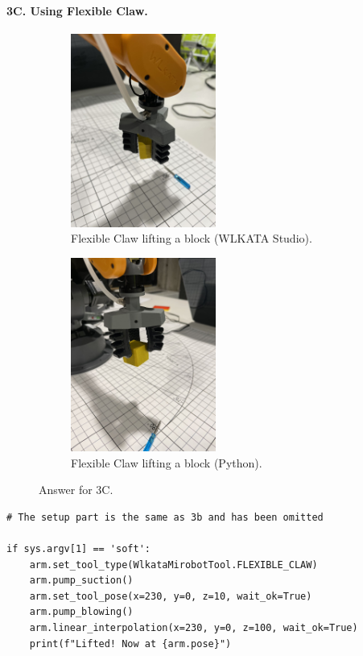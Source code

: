\newpage
\paragraph{3C. Using Flexible Claw.}
\begin{figure}
    \centering
    \begin{subfigure}[b]{0.3\textwidth}
        \includegraphics[height=2.5in]{image/3c_studio.jpg}
         \caption*{Flexible Claw lifting a block (WLKATA Studio).}
     \end{subfigure}
     \hfill
     \begin{subfigure}[b]{0.3\textwidth}
        \includegraphics[height=2.5in]{image/3c_python.jpg}
         \caption*{Flexible Claw lifting a block (Python).}
     \end{subfigure}
    \caption*{Answer for 3C.}
\end{figure}
%
\begin{verbatim}
# The setup part is the same as 3b and has been omitted

if sys.argv[1] == 'soft':
    arm.set_tool_type(WlkataMirobotTool.FLEXIBLE_CLAW)
    arm.pump_suction()
    arm.set_tool_pose(x=230, y=0, z=10, wait_ok=True)
    arm.pump_blowing()
    arm.linear_interpolation(x=230, y=0, z=100, wait_ok=True)
    print(f"Lifted! Now at {arm.pose}")
\end{verbatim}


